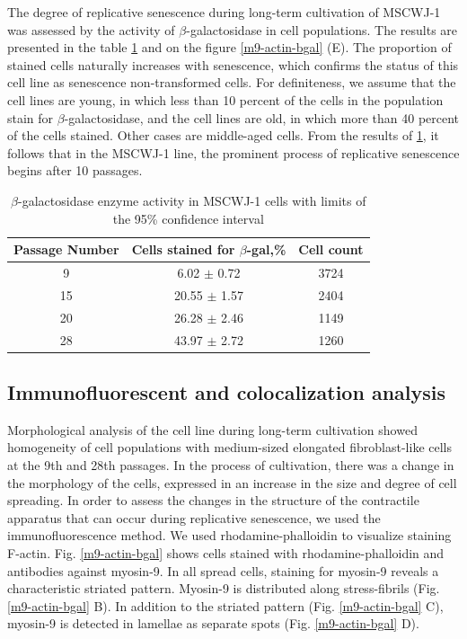 \documentclass[english,authoryear]{elsarticle}
\begin{document}
The degree of replicative senescence during long-term cultivation of MSCWJ-1 was assessed by the activity of $\beta$-galactosidase in cell populations.
The results are presented in the table \ref{tab} and on the figure \ref{m9-actin-bgal} (E).
The proportion of stained cells naturally increases with senescence, which confirms the status of this cell line as senescence non-transformed cells.
For definiteness, we assume that  the cell lines are young, in which less than 10 percent of the cells in the population stain for $\beta$-galactosidase, and
the cell lines are old, in which more than 40 percent of the cells stained. Other cases are middle-aged cells.
From the results of \ref{tab}, it follows that in the MSCWJ-1 line, the prominent process of replicative senescence begins after 10 passages.


\begin{table}[ht]
  \caption{$\beta$-galactosidase enzyme activity in MSCWJ-1 cells with limits of the 95\% confidence interval}
  \label{tab}
\centering
\begin{tabular}{c|c|c}
 Passage Number & Cells stained for $\beta$-gal,\% & Cell count  \\
 \hline
 9 & 6.02 $\pm$ 0.72 & 3724 \\
 15 & 20.55 $\pm$ 1.57 & 2404 \\
 20 & 26.28 $\pm$ 2.46 & 1149  \\
 28 & 43.97 $\pm$ 2.72 & 1260

\end{tabular}
\end{table}

\subsection{Immunofluorescent and colocalization analysis}

Morphological analysis of the cell line during long-term cultivation showed homogeneity of cell populations with medium-sized elongated fibroblast-like cells at the 9th and 28th passages.
In the process of cultivation, there was a change in the morphology of the cells, expressed in an increase in the size and degree of cell spreading.
In order to assess the changes in the structure of the contractile apparatus that can occur during replicative senescence, we used the immunofluorescence method.
We used rhodamine-phalloidin to visualize staining F-actin.
Fig. \ref{m9-actin-bgal} shows cells stained with rhodamine-phalloidin and antibodies against myosin-9.
In all spread cells, staining for myosin-9 reveals a characteristic striated pattern.
Myosin-9 is distributed along stress-fibrils (Fig. \ref{m9-actin-bgal} B).
In addition to the striated pattern (Fig. \ref{m9-actin-bgal} C), myosin-9 is detected in lamellae as separate spots (Fig. \ref{m9-actin-bgal} D).
\end{document}
